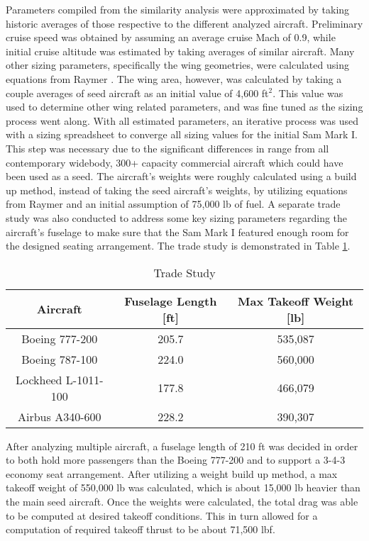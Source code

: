 Parameters compiled from the similarity analysis were approximated by taking historic averages of those respective to the different analyzed aircraft. Preliminary cruise speed was obtained by assuming an average cruise Mach of 0.9, while initial cruise altitude was estimated by taking averages of similar aircraft. Many other sizing parameters, specifically the wing geometries, were calculated using equations from Raymer \cite{raymer}. The wing area, however, was calculated by taking a couple averages of seed aircraft as an initial value of 4,600 ft$^2$. This value was used to determine other wing related parameters, and was fine tuned as the sizing process went along. With all estimated parameters, an iterative process was used with a sizing spreadsheet to converge all sizing values for the initial Sam Mark I. This step was necessary due to the significant differences in range from all contemporary widebody, 300+ capacity commercial aircraft which could have been used as a seed.  The aircraft's weights were roughly calculated using a build up method, instead of taking the seed aircraft's weights, by utilizing equations from Raymer \cite{raymer} and an initial assumption of 75,000 lb of fuel. A separate trade study was also conducted to address some key sizing parameters regarding the aircraft's fuselage to make sure that the Sam Mark I featured enough room for the designed seating arrangement. The trade study is demonstrated in Table \ref{tab:trade_params}.

\begin{table}[!h] 
    \centering
    \caption{Trade Study}
    \begin{tabular}{ |c||c||c| }\toprule
    \textbf{Aircraft} & \textbf{Fuselage Length [ft]} & \textbf{Max Takeoff Weight [lb]} \\\hline\hline
    Boeing 777-200 & 205.7 & 535,087  \\\hline
    Boeing 787-100 & 224.0 & 560,000  \\\hline
    Lockheed L-1011-100 & 177.8 & 466,079  \\\hline
    Airbus A340-600 & 228.2 & 390,307  \\\hline

    \end{tabular}\label{tab:trade_params}
\end{table}

\newpage

After analyzing multiple aircraft, a fuselage length of 210 ft was decided in order to both hold more passengers than the Boeing 777-200 and to support a 3-4-3 economy seat arrangement. After utilizing a weight build up method, a max takeoff weight of 550,000 lb was calculated, which is about 15,000 lb heavier than the main seed aircraft. Once the weights were calculated, the total drag was able to be computed at desired takeoff conditions. This in turn allowed for a computation of required takeoff thrust to be about 71,500 lbf. 


